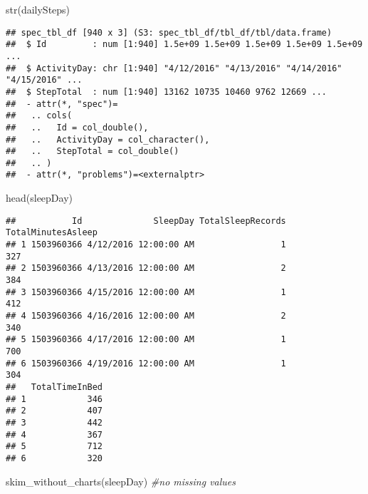\documentclass[
]{article}
\newenvironment{Shaded}{\begin{snugshade}}{\end{snugshade}}
\newcommand{\CommentTok}[1]{\textcolor[rgb]{0.56,0.35,0.01}{\textit{#1}}}
\newcommand{\FunctionTok}[1]{\textcolor[rgb]{0.00,0.00,0.00}{#1}}
\newcommand{\NormalTok}[1]{#1}
\begin{document}
\begin{Shaded}
\begin{Highlighting}[]
\FunctionTok{str}\NormalTok{(dailySteps)}
\end{Highlighting}
\end{Shaded}

\begin{verbatim}
## spec_tbl_df [940 x 3] (S3: spec_tbl_df/tbl_df/tbl/data.frame)
##  $ Id         : num [1:940] 1.5e+09 1.5e+09 1.5e+09 1.5e+09 1.5e+09 ...
##  $ ActivityDay: chr [1:940] "4/12/2016" "4/13/2016" "4/14/2016" "4/15/2016" ...
##  $ StepTotal  : num [1:940] 13162 10735 10460 9762 12669 ...
##  - attr(*, "spec")=
##   .. cols(
##   ..   Id = col_double(),
##   ..   ActivityDay = col_character(),
##   ..   StepTotal = col_double()
##   .. )
##  - attr(*, "problems")=<externalptr>
\end{verbatim}

\begin{Shaded}
\begin{Highlighting}[]
\FunctionTok{head}\NormalTok{(sleepDay)}
\end{Highlighting}
\end{Shaded}

\begin{verbatim}
##           Id              SleepDay TotalSleepRecords TotalMinutesAsleep
## 1 1503960366 4/12/2016 12:00:00 AM                 1                327
## 2 1503960366 4/13/2016 12:00:00 AM                 2                384
## 3 1503960366 4/15/2016 12:00:00 AM                 1                412
## 4 1503960366 4/16/2016 12:00:00 AM                 2                340
## 5 1503960366 4/17/2016 12:00:00 AM                 1                700
## 6 1503960366 4/19/2016 12:00:00 AM                 1                304
##   TotalTimeInBed
## 1            346
## 2            407
## 3            442
## 4            367
## 5            712
## 6            320
\end{verbatim}

\begin{Shaded}
\begin{Highlighting}[]
\FunctionTok{skim\_without\_charts}\NormalTok{(sleepDay) }\CommentTok{\#no missing values}
\end{Highlighting}
\end{Shaded}
\end{document}

